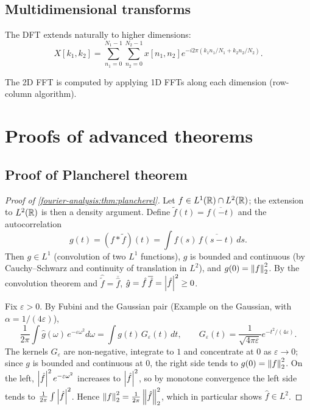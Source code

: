 \begin{notechapter}
\subsection{Multidimensional transforms}

The DFT extends naturally to higher dimensions:
\[
X[k_1, k_2] = \sum_{n_1=0}^{N_1-1} \sum_{n_2=0}^{N_2-1} x[n_1, n_2] e^{-i2\pi(k_1 n_1/N_1 + k_2 n_2/N_2)}.
\]

The 2D FFT is computed by applying 1D FFTs along each dimension (row-column algorithm).


\chapterappendix

\section{Proofs of advanced theorems}

\subsection{Proof of Plancherel theorem}

\begin{proof}[Proof of \cref{fourier-analysis:thm:plancherel}]
Let $f \in L^1(\mathbb{R}) \cap L^2(\mathbb{R})$; the extension to $L^2(\mathbb{R})$ is then a density argument. Define $\tilde f(t) = \overline{f(-t)}$ and the autocorrelation
\[
g(t) = (f * \tilde f)(t) = \int f(s)\,\overline{f(s-t)}\,ds .
\]
Then $g \in L^1$ (convolution of two $L^1$ functions), $g$ is bounded and continuous (by Cauchy--Schwarz and continuity of translation in $L^2$), and $g(0) = \left\|f\right\|_2^2$. By the convolution theorem and $\hat{\tilde f} = \overline{\hat f}$, $\hat g = \hat f\,\overline{\hat f} = \left|\hat f\right|^2 \ge 0$.

Fix $\varepsilon > 0$. By Fubini and the Gaussian pair (Example on the Gaussian, with $\alpha = 1/(4\varepsilon)$),
\[
\frac{1}{2\pi}\int \hat g(\omega)\,e^{-\varepsilon\omega^2}d\omega
= \int g(t)\,G_\varepsilon(t)\,dt,
\qquad G_\varepsilon(t) = \frac{1}{\sqrt{4\pi\varepsilon}}e^{-t^2/(4\varepsilon)} .
\]
The kernels $G_\varepsilon$ are non-negative, integrate to $1$ and concentrate at $0$ as $\varepsilon\to0$; since $g$ is bounded and continuous at $0$, the right side tends to $g(0) = \left\|f\right\|_2^2$. On the left, $\left|\hat f\right|^2 e^{-\varepsilon\omega^2}$ increases to $\left|\hat f\right|^2$, so by monotone convergence the left side tends to $\frac1{2\pi}\int\left|\hat f\right|^2$. Hence $\left\|f\right\|_2^2 = \frac1{2\pi}\left\|\hat f\right\|_2^2$, which in particular shows $\hat f \in L^2$.
\end{proof}


\end{notechapter}
